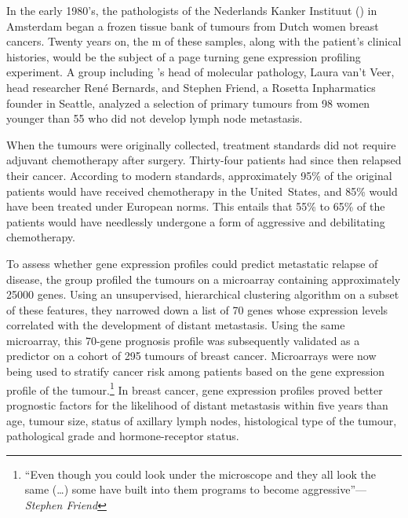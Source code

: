 
\medskip

In the early 1980's, the pathologists of the Nederlands Kanker Instituut
() in Amsterdam began a frozen tissue bank of tumours from Dutch
women breast cancers.  Twenty years on, the m of these samples,
along with the patient's clinical histories, would be the subject of a page
turning gene expression profiling experiment.  A group including
's head of molecular pathology, Laura van't Veer, head researcher
René Bernards, and Stephen Friend, a Rosetta Inpharmatics founder in Seattle,
analyzed a selection of primary tumours from 98 women younger than 55 who did
not develop lymph node metastasis.\cite{vant_veer_gene_2002}

When the tumours were originally collected, treatment standards did not require
adjuvant chemotherapy after surgery.  Thirty-four patients had since then
relapsed their cancer.  According to modern standards, approximately 95\% of the
original patients would have received chemotherapy in the \mbox{United States},
and 85\% would have been treated under European norms.  This entails that 55\%
to 65\% of the patients would have needlessly undergone a form of aggressive and
debilitating chemotherapy.

To assess whether gene expression profiles could predict metastatic relapse of
disease, the  group profiled the tumours on a microarray
containing approximately \num{25000} genes.  Using an unsupervised, hierarchical
clustering algorithm on a subset of these features, they narrowed down a list of
70 genes whose expression levels correlated with the development of distant
metastasis.  Using the same microarray, this \mbox{70-gene} prognosis profile
was subsequently validated as a predictor on a  cohort of 295
tumours of breast cancer.\cite{van_de_vijver_gene-expression_2002} Microarrays
were now being used to stratify cancer risk among patients based on the gene
expression profile of the tumour.\footnote{``Even though you could look under
  the microscope and they all look the same (\ldots{}) some have built into them
  programs to become aggressive''---\emph{Stephen Friend}} In breast cancer,
gene expression profiles proved better prognostic factors for the likelihood of
distant metastasis within five years than age, tumour size, status of axillary
lymph nodes, histological type of the tumour, pathological grade and
\mbox{hormone-receptor} status.

